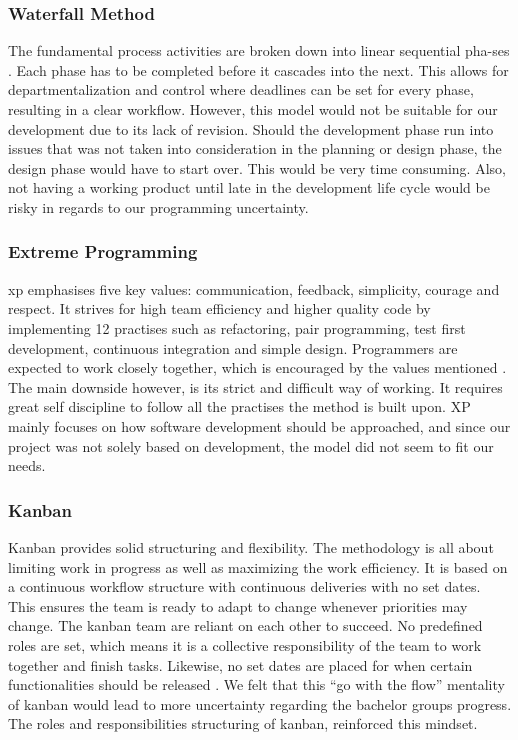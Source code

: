 \subsubsection*{Waterfall Method}
The fundamental process activities are broken down into linear sequential pha-ses \cite{WaterfallMethod}. Each phase has to be completed before it cascades into the next. This allows for departmentalization and control where deadlines can be set for every phase, resulting in a clear workflow. However, this model would not be suitable for our development due to its lack of revision. Should the development phase run into issues that was not taken into consideration in the planning or design phase, the design phase would have to start over. This would be very time consuming. Also, not having a working product until late in the development life cycle would be risky in regards to our programming uncertainty.   

\subsubsection*{Extreme Programming}
\acrfull{xp} emphasises five key values: communication, feedback, simplicity, courage and respect. It strives for high team efficiency and higher quality code by implementing 12 practises such as refactoring, pair programming, test first development, continuous integration and simple design. Programmers are expected to work closely together, which is encouraged by the values mentioned \cite{eXtremeP}. The main downside however, is its strict and difficult way of working. It requires great self discipline to follow all the practises the method is built upon. XP mainly focuses on how software development should be approached, and since our project was not solely based on development, the model did not seem to fit our needs.  
\newpage

\subsubsection*{Kanban}
Kanban provides solid structuring and flexibility. The methodology is all about limiting work in progress as well as maximizing the work efficiency. It is based on a continuous workflow structure with continuous deliveries with no set dates. This ensures the team is ready to adapt to change whenever priorities may change. The kanban team are reliant on each other to succeed. No predefined roles are set, which means it is a collective responsibility of the team to work together and finish tasks. Likewise, no set dates are placed for when certain functionalities should be released \cite{kanban}. We felt that this ``go with the flow'' mentality of kanban would lead to more uncertainty regarding the bachelor groups progress. The roles and responsibilities structuring of kanban, reinforced this mindset.  

